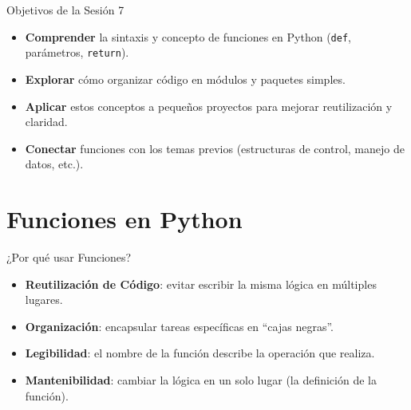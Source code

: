 \documentclass[10pt]{beamer}
\begin{document}
\begin{frame}{Objetivos de la Sesión 7}
  \begin{itemize}
    \item \textbf{Comprender} la sintaxis y concepto de funciones en Python (\texttt{def}, parámetros, \texttt{return}).
    \item \textbf{Explorar} cómo organizar código en módulos y paquetes simples.
    \item \textbf{Aplicar} estos conceptos a pequeños proyectos para mejorar reutilización y claridad.
    \item \textbf{Conectar} funciones con los temas previos (estructuras de control, manejo de datos, etc.).
  \end{itemize}
\end{frame}

\section{Funciones en Python}

\begin{frame}{¿Por qué usar Funciones?}
  \begin{itemize}
    \item \textbf{Reutilización de Código}: evitar escribir la misma lógica en múltiples lugares.
    \item \textbf{Organización}: encapsular tareas específicas en “cajas negras”.
    \item \textbf{Legibilidad}: el nombre de la función describe la operación que realiza.
    \item \textbf{Mantenibilidad}: cambiar la lógica en un solo lugar (la definición de la función).
  \end{itemize}
\end{frame}
\end{document}
